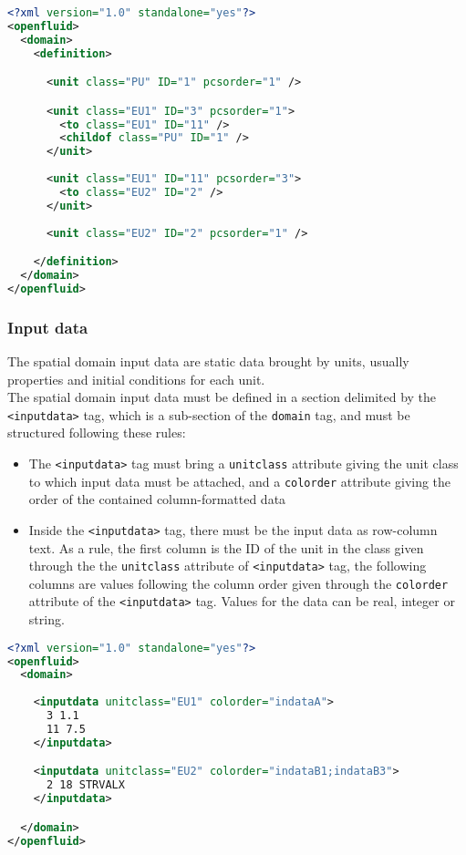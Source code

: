 \begin{lstlisting}[language=xml,title=\footnotesize\textit{example}]
<?xml version="1.0" standalone="yes"?>
<openfluid>
  <domain>
    <definition>

      <unit class="PU" ID="1" pcsorder="1" />

      <unit class="EU1" ID="3" pcsorder="1">
        <to class="EU1" ID="11" />
        <childof class="PU" ID="1" />
      </unit>
      
      <unit class="EU1" ID="11" pcsorder="3">
        <to class="EU2" ID="2" />
      </unit>
      
      <unit class="EU2" ID="2" pcsorder="1" />

    </definition>
  </domain>
</openfluid>
\end{lstlisting}
\bigskip


\subsubsection{Input data}

The spatial domain input data are static data brought by units, usually properties and initial conditions for each unit.\\
\noindent The spatial domain input data must be defined in a section delimited
by the \texttt{<inputdata>} tag, which is a sub-section of the \texttt{domain}
tag, and must be structured following these rules:
\begin{itemize}
  \item The \texttt{<inputdata>} tag must bring a \texttt{unitclass}
  attribute giving the unit class to which input data must be attached, and a
  \texttt{colorder} attribute giving the order of the contained column-formatted
  data
  \item Inside the \texttt{<inputdata>} tag, there must be the input data as 
  row-column text. As a rule, the first column is the ID of the unit in the class
  given through the the \texttt{unitclass} attribute of \texttt{<inputdata>}
  tag, the following columns are values following the column order given
  through the \texttt{colorder} attribute of the \texttt{<inputdata>} tag.
  Values for the data can be real, integer or string.
\end{itemize}

\bigskip

\begin{lstlisting}[language=xml,title=\footnotesize\textit{example}]
<?xml version="1.0" standalone="yes"?>
<openfluid>
  <domain>
  
    <inputdata unitclass="EU1" colorder="indataA">
      3 1.1
      11 7.5
    </inputdata>

    <inputdata unitclass="EU2" colorder="indataB1;indataB3">
      2 18 STRVALX
    </inputdata>

  </domain>
</openfluid>
\end{lstlisting}


